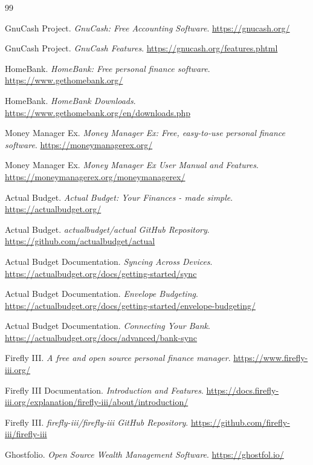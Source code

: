 \documentclass[11pt]{article}
\begin{document}
\newpage
\begin{thebibliography}{99}

 GnuCash Project. \emph{GnuCash: Free Accounting Software}. \url{https://gnucash.org/}

 GnuCash Project. \emph{GnuCash Features}. \url{https://gnucash.org/features.phtml}

 HomeBank. \emph{HomeBank: Free personal finance software}. \url{https://www.gethomebank.org/}

 HomeBank. \emph{HomeBank Downloads}. \url{https://www.gethomebank.org/en/downloads.php}

 Money Manager Ex. \emph{Money Manager Ex: Free, easy-to-use personal finance software}. \url{https://moneymanagerex.org/}

 Money Manager Ex. \emph{Money Manager Ex User Manual and Features}. \url{https://moneymanagerex.org/moneymanagerex/}

 Actual Budget. \emph{Actual Budget: Your Finances - made simple}. \url{https://actualbudget.org/}

 Actual Budget. \emph{actualbudget/actual GitHub Repository}. \url{https://github.com/actualbudget/actual}

 Actual Budget Documentation. \emph{Syncing Across Devices}. \url{https://actualbudget.org/docs/getting-started/sync}

 Actual Budget Documentation. \emph{Envelope Budgeting}. \url{https://actualbudget.org/docs/getting-started/envelope-budgeting/}

 Actual Budget Documentation. \emph{Connecting Your Bank}. \url{https://actualbudget.org/docs/advanced/bank-sync}

 Firefly III. \emph{A free and open source personal finance manager}. \url{https://www.firefly-iii.org/}

 Firefly III Documentation. \emph{Introduction and Features}. \url{https://docs.firefly-iii.org/explanation/firefly-iii/about/introduction/}

 Firefly III. \emph{firefly-iii/firefly-iii GitHub Repository}. \url{https://github.com/firefly-iii/firefly-iii}

 Ghostfolio. \emph{Open Source Wealth Management Software}. \url{https://ghostfol.io/}


\end{thebibliography}
\end{document}
